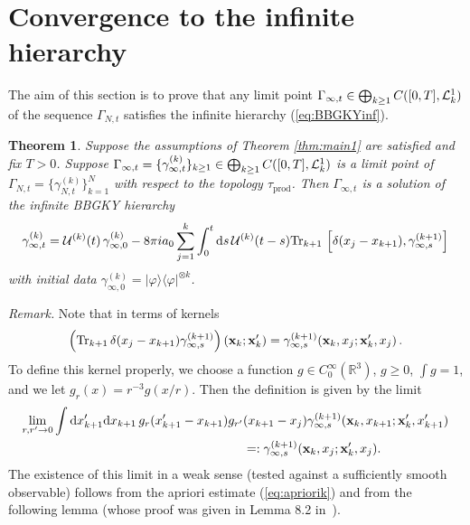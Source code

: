 \documentclass[11pt]{article}
\newtheorem{theorem}{Theorem}[section]
\newcommand{\rd}{{\rm d}}
\newcommand{\bx}{{\bf x}}
\newcommand{\ph}{\varphi}
\newcommand{\cU}{{\cal U}}
\newcommand{\bR}{{\mathbb R}}
\newcommand{\tr}{\mbox{Tr}}
\newcommand{\cL}{{\cal L}}
\begin{document}
\section{Convergence to the infinite hierarchy}
\setcounter{equation}{0}

The aim of this section is to prove that any limit point $
\Gamma_{\infty,t} \in \bigoplus_{k \geq 1} C([0,T], \cL^1_k)$ of the
sequence $ \Gamma_{N,t}$ satisfies the infinite hierarchy
(\ref{eq:BBGKYinf}).

\begin{theorem}\label{thm:convergence} Suppose
the assumptions of Theorem \ref{thm:main1} are satisfied and
fix $T>0$. Suppose $
\Gamma_{\infty,t} = \{ \gamma_{\infty,t}^{(k)} \}_{k\geq 1} \in
\bigoplus_{k \geq 1} C([0,T], \cL^1_k)$ is a limit point of $
\Gamma_{N,t} = \{ \gamma_{N,t}^{(k)} \}_{k=1}^N$ with respect to the
topology $\tau_{\text{prod}}$. Then $ \Gamma_{\infty,t}$ is a
solution of the infinite BBGKY hierarchy
\begin{equation}\label{infbbgky}
\begin{split}
 \gamma^{(k)}_{\infty,t} = \cU^{(k)} (t) \,
\gamma^{(k)}_{\infty,0} - 8\pi i a_0 \sum_{j=1}^k \int_0^t \rd s \,
\cU^{(k)} (t-s) \tr_{k+1}\, \left[\delta (x_j -x_{k+1}),
\gamma^{(k+1)}_{\infty,s} \right]
\end{split}
\end{equation}
with initial data $ \gamma^{(k)}_{\infty,0} = |\ph
\rangle\langle\ph|^{\otimes k}$.
\end{theorem}

{\it Remark.} Note that in terms of kernels
\[ \left( \tr_{k+1} \, \delta (x_j -x_{k+1})
\gamma^{(k+1)}_{\infty,s} \right) (\bx_k;\bx'_k) =
\gamma^{(k+1)}_{\infty,s} (\bx_k,x_j; \bx'_k,x_j) \,. \] To define
this kernel properly,
we  choose a function
$g\in C_0^{\infty} (\bR^3)$, $g \geq 0$, $\int g =1$, and we let
$g_r(x) = r^{-3} g (x/r)$.
 Then the definition is given by the limit
\begin{equation}\label{eq:limrr'}
\begin{split}
\lim_{r,r' \to 0} \int \rd x'_{k+1} \rd x_{k+1} \, g_r (x'_{k+1} -
x_{k+1}) g_{r'} &(x_{k+1} - x_j)
 \gamma^{(k+1)}_{\infty,s} (\bx_k , x_{k+1} ; \bx'_k , x'_{k+1}) \\
&= :  \gamma^{(k+1)}_{\infty,s} (\bx_k, x_j ; \bx'_k , x_j).
\end{split}
\end{equation}
The existence of this limit in a weak sense (tested against a
sufficiently smooth observable) follows from the apriori estimate
(\ref{eq:apriorik}) and from the following lemma (whose proof was
given in Lemma 8.2 in~\cite{ESY2}).
\end{document}
